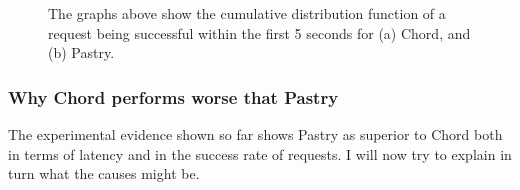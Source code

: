 \begin{figure}[!h]
  \centering
  \caption{The graphs above show the cumulative distribution function of a request being successful within the first 5 seconds for (a) Chord, and (b) Pastry.}
\end{figure}

\subsubsection{Why Chord performs worse that Pastry}
The experimental evidence shown so far shows Pastry as superior to Chord both in terms of latency and in the success rate of requests. I will now try to explain in turn what the causes might be.

